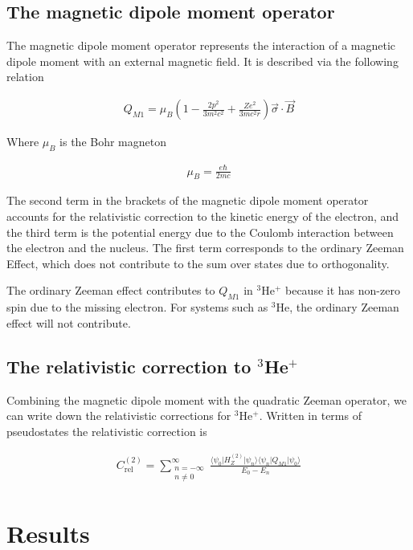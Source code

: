         \subsection{The magnetic dipole moment operator}\label{sec:magnetic_dipole_operator}
            The magnetic dipole moment operator represents the interaction of a magnetic dipole moment with an external magnetic field. It is described via the following relation

            \begin{align}
                Q_{M1} = \mu_B \left( 1 - \frac{2p^2}{3m^2 c^2} + \frac{Ze^2}{3mc^2r} \right) \vec{\sigma} \cdot \vec{B}
            \end{align}

            \noindent Where $\mu_B$ is the Bohr magneton
            
            \begin{align}
                \mu_B = \frac{e \hbar}{2mc}
            \end{align}

            \noindent The second term in the brackets of the magnetic dipole moment operator accounts for the relativistic correction to the kinetic energy of the electron, and the third term is the potential energy due to the Coulomb interaction between the electron and the nucleus. The first term corresponds to the ordinary Zeeman Effect, which does not contribute to the sum over states due to orthogonality.

            The ordinary Zeeman effect contributes to $Q_{M1}$ in $^3$He$^+$ because it has non-zero spin due to the missing electron. For systems such as $^3$He, the ordinary Zeeman effect will not contribute.

        \subsection{The relativistic correction to $^3$He$^+$}\label{sec:Relativistic_Correction}
            Combining the magnetic dipole moment with the quadratic Zeeman operator, we can write down the relativistic
            corrections for $^3$He$^+$. Written in terms of pseudostates the relativistic correction is

            \begin{align}
                C_{\text{rel}}^{(2)} =\sum_{\substack{n = -\infty \\ n \neq 0}}^{\infty}
                \frac{\langle \psi_0 \vert H_Z^{(2)} \vert \psi_n \rangle \langle \psi_n \vert Q_{M1} \vert \psi_0 \rangle}{E_0 - E_n}
            \end{align}


    \section{Results}\label{sec:results}





